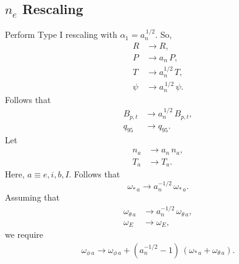 \documentclass[12pt]{article}
\begin{document}
\subsection{$n_e$ Rescaling}
Perform Type I rescaling with $\alpha_1 =a_n^{\,1/2}$. So,
\begin{align}
R&\rightarrow R,\\[0.5ex]
P&\rightarrow a_n\,P,\\[0.5ex]
T&\rightarrow a_n^{1/2}\,T,\\[0.5ex]
\psi&\rightarrow a_n^{\,1/2}\,\psi.
\end{align}
Follows that
\begin{align}
B_{p,t}&\rightarrow a_n^{\,1/2}\,B_{p,t},\\[0.5ex]
q_{95}&\rightarrow q_{95}.
\end{align}
Let
\begin{align}
n_a&\rightarrow a_n\,n_a,\\[0.5ex]
T_a&\rightarrow T_a.
\end{align}
Here, $a\equiv e, i, b, I$. 
Follows that
\begin{equation}
\omega_{\ast\,a} \rightarrow a_n^{-1/2}\,\omega_{\ast\,a}.
\end{equation}
Assuming that
\begin{align}
\omega_{\theta\,a}&\rightarrow a_n^{-1/2}\,\omega_{\theta\,a},\\[0.5ex]
\omega_E&\rightarrow\omega_E,
\end{align}
we require 
\begin{align}
\omega_{\phi\,a}\rightarrow \omega_{\phi\,a}+(a_n^{-1/2}-1)\,(\omega_{\ast\,a}+\omega_{\theta\,a}).
\end{align}
\end{document}
